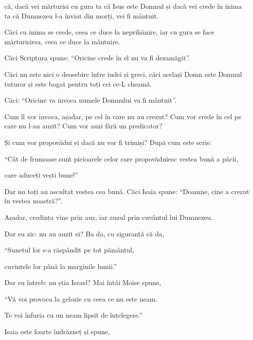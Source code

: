 {că, dacă vei mărturisi cu gura ta că Isus este Domnul și dacă vei crede în inima ta că Dumnezeu l-a înviat din morți, vei fi mântuit.

Căci cu inima se crede, ceea ce duce la neprihănire, iar cu gura se face mărturisirea, ceea ce duce la mântuire.

Căci Scriptura spune: “Oricine crede în el nu va fi dezamăgit”.


\par }{\PP {}Căci nu este nici o deosebire între iudei și greci, căci același Domn este Domnul tuturor și este bogat pentru toți cei ce-L cheamă.

Căci: “Oricine va invoca numele Domnului va fi mântuit”.

Cum îl vor invoca, așadar, pe cel în care nu au crezut? Cum vor crede în cel pe care nu l-au auzit? Cum vor auzi fără un predicator?

Și cum vor propovădui ei dacă nu vor fi trimiși? După cum este scris:

\par }{\Q “Cât de frumoase sunt picioarele celor care propovăduiesc vestea bună a păcii,

\par }{\QB care aduceți vești bune!”


\par }{\PP {}Dar nu toți au ascultat vestea cea bună. Căci Isaia spune: “Doamne, cine a crezut în vestea noastră?”.

Așadar, credința vine prin auz, iar auzul prin cuvântul lui Dumnezeu.

Dar eu zic: nu au auzit ei? Ba da, cu siguranță că da,

\par }{\Q “Sunetul lor s-a răspândit pe tot pământul,

\par }{\QB cuvintele lor până la marginile lumii.”


\par }{\PP {}Dar eu întreb: nu știa Israel? Mai întâi Moise spune,

\par }{\Q “Vă voi provoca la gelozie cu ceea ce nu este neam.

\par }{\QB Te voi înfuria cu un neam lipsit de înțelegere.”


\par }{\PP {}Isaia este foarte îndrăzneț și spune,

}
